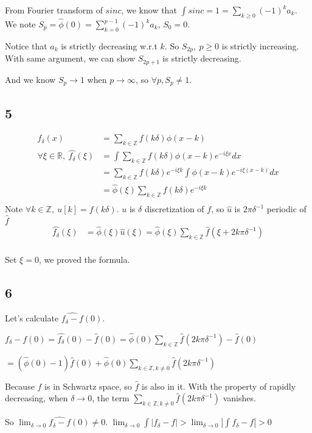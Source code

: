 \documentclass{article}
\begin{document}
	From Fourier transform of $sinc$, we know that $\int sinc = 1 = \sum_{k\geq0} (-1)^k a_k$.  We note $S_p = \hat{\phi}(0) = \sum_{k=0}^{p-1} (-1)^k a_k$, $S_0=0$.
	
	Notice that $a_k$ is strictly decreasing w.r.t $k$. So $S_{2p},\ p\geq 0$ is strictly increasing. 
	With same argument, we can show $S_{2p+1}$ is strictly decreasing.
	
	And we know $S_{p} \rightarrow 1$ when $p\rightarrow \infty$, so $\forall p, S_{p} \neq 1$.
	\subsection*{5}
	\begin{equation*}
	\begin{split}
	f_\delta(x) &= \sum_{k\in\mathbb{Z}} f(k\delta)\phi(x-k)\\
	\forall \xi\in\mathbb{R},\ \hat{f_\delta}(\xi) &= \int \sum_{k\in\mathbb{Z}} f(k\delta)\phi(x-k) e^{-i\xi x} dx\\
	&=  \sum_{k\in\mathbb{Z}} f(k\delta) e^{-i\xi k} \int \phi(x-k) e^{-i\xi (x-k)}  dx\\
	&=  \hat{\phi}(\xi) \sum_{k\in\mathbb{Z}} f(k\delta) e^{-i\xi k} \\
	\end{split}
	\end{equation*}
	Note $\forall k\in\mathbb{Z},\ u[k] = f(k\delta)$. $u$ is $\delta$ discretization of $f$, so $\hat{u}$ is $2\pi \delta^{-1}$ periodic of $\hat{f}$
	\begin{equation*}
	\begin{split}
	\hat{f_\delta}(\xi)
	&=  \hat{\phi}(\xi) \hat{u}(\xi) = \hat{\phi}(\xi) \sum_{k\in\mathbb{Z}} \hat{f}(\xi + 2k\pi\delta^{-1})\\
	\end{split}
	\end{equation*}
	
	Set $\xi=0$, we proved the formula.
	
	\subsection*{6}
	Let's calculate $\widehat{f_\delta - f}(0)$.
	
	$\widehat{f_\delta - f}(0) = \hat{f_\delta}(0)-\hat{f}(0) = \hat{\phi}(0) \sum_{k\in\mathbb{Z}} \hat{f}(2k\pi\delta^{-1}) -\hat{f}(0)$
	
	$=(\hat{\phi}(0)-1) \hat{f}(0) + \hat{\phi}(0) \sum_{k\in\mathbb{Z}, k\neq 0} \hat{f}(2k\pi\delta^{-1})$
	
	Because $f$ is in Schwartz space, so $\hat{f}$ is also in it. With the property of rapidly decreasing, when $\delta \rightarrow 0$, the term $\sum_{k\in\mathbb{Z}, k\neq 0} \hat{f}(2k\pi\delta^{-1})$ vanishes.
	
	So $\lim_{\delta \rightarrow 0} \widehat{f_\delta - f}(0) \neq 0$. $\lim_{\delta \rightarrow 0} \int |f_\delta-f| > \lim_{\delta \rightarrow 0} |\int f_\delta-f| > 0$
\end{document}
